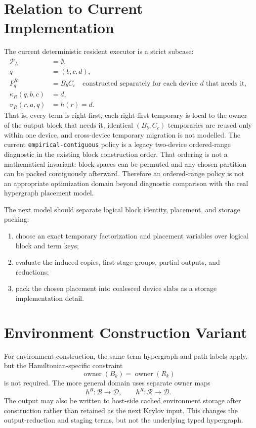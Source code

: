 \documentclass[11pt]{article}
\begin{document}
\section{Relation to Current Implementation}

The current deterministic resident executor is a strict subcase:
\begin{align}
  \mathcal{P}_L &= \emptyset,\\
  q &= (b,c,d),\\
  P^R_q &= B_bC_c \quad \text{constructed separately for each device } d
            \text{ that needs it},\\
  \kappa_R(q,b,c) &= d,\\
  \sigma_R(r,a,q) &= h(r) = d.
\end{align}
That is, every term is right-first, each right-first temporary is local to the
owner of the output block that needs it, identical $(B_b,C_c)$ temporaries are
reused only within one device, and cross-device temporary migration is not
modelled.  The current \texttt{empirical-contiguous} policy is a legacy
two-device ordered-range diagnostic in the existing block construction order.
That ordering is not a mathematical invariant: block spaces can be permuted and
any chosen partition can be packed contiguously afterward.  Therefore an
ordered-range policy is not an appropriate optimization domain beyond
diagnostic comparison with the real hypergraph placement model.

The next model should separate logical block identity, placement, and storage
packing:
\begin{enumerate}
  \item choose an exact temporary factorization and placement variables over
        logical block and term keys;
  \item evaluate the induced copies, first-stage groups, partial outputs, and
        reductions;
  \item pack the chosen placement into coalesced device slabs as a storage
        implementation detail.
\end{enumerate}

\section{Environment Construction Variant}

For environment construction, the same term hypergraph and path labels apply,
but the Hamiltonian-specific constraint
\begin{equation}
  \operatorname{owner}(B_k) = \operatorname{owner}(R_k)
\end{equation}
is not required.  The more general domain uses separate owner maps
\begin{equation}
  h^B : \mathcal{B} \to \mathcal{D}, \qquad
  h^R : \mathcal{R} \to \mathcal{D}.
\end{equation}
The output may also be written to host-side cached environment storage after
construction rather than retained as the next Krylov input.  This changes the
output-reduction and staging terms, but not the underlying typed hypergraph.
\end{document}
